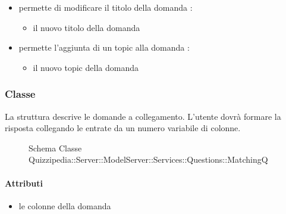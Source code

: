 \begin{itemize}
\begin{itemize}
\end{itemize}
\item {}
\newline
permette di modificare il titolo della domanda
\newline
{} :
\begin{itemize}
\item {}
\newline
il nuovo titolo della domanda
\end{itemize}
\item {}
\newline
permette l'aggiunta di un topic alla domanda
\newline
{} :
\begin{itemize}
\item {}
\newline
il nuovo topic della domanda
\end{itemize}
\end{itemize}
\subsubsection{Classe }
La struttura descrive le domande a collegamento. L'utente dovrà formare la risposta collegando le entrate da un numero variabile di colonne.
\begin{figure}[H]
\centering
\noindent{}
\caption[Schema Classe MatchingQ]{Schema Classe Quizzipedia::Server::ModelServer::Services::Questions::MatchingQ}
\end{figure}
\paragraph{Attributi}
\begin{itemize}
\item {}
\newline
le colonne della domanda
\end{itemize}

